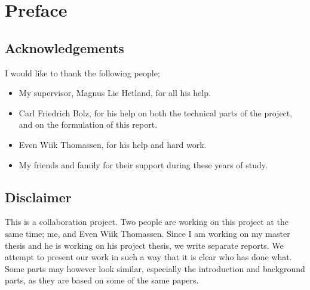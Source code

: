 
\chapter*{Preface}

\section*{Acknowledgements}

I would like to thank the following people;

\begin{itemize}

\item My supervisor, Magnus Lie Hetland, for all his help.

\item Carl Friedrich Bolz, for his help on both the technical parts
of the project, and on the formulation of this report.

\item Even Wiik Thomassen, for his help and hard work.

\item My friends and family for their support during these years of study.

\end{itemize}


\section*{Disclaimer}

This is a collaboration project. Two people are working on this
project at the same time; me, and Even Wiik Thomassen. Since I am working
on my master thesis and he is working on his project thesis, we 
write separate reports. We attempt to present our work in such a way that
it is clear who has done what. Some parts may however look similar,
especially the introduction and background parts, as they are based on 
some of the same papers.


